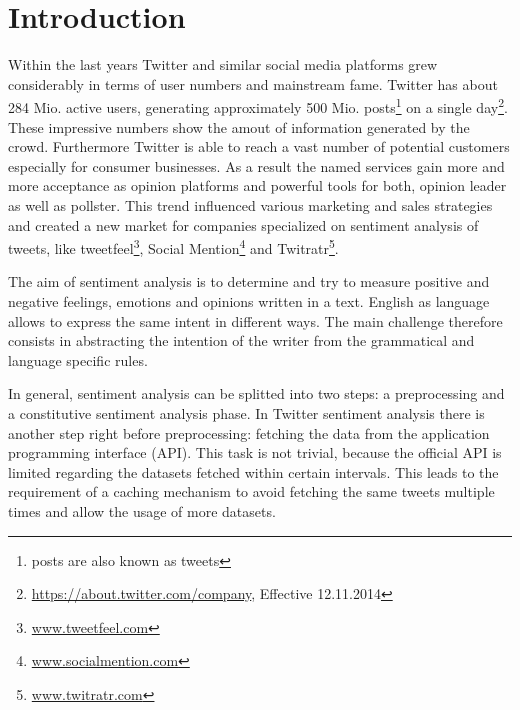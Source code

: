 \section{Introduction}


Within the last years Twitter and similar social media platforms grew considerably in terms of user numbers and mainstream fame. Twitter has about 284 Mio. active users, generating approximately 500 Mio. posts\footnote{posts are also known as tweets} on a single day\footnote{\url{https://about.twitter.com/company}, Effective 12.11.2014}. These impressive numbers show the amout of information generated by the crowd. Furthermore Twitter is able to reach a vast number of potential customers especially for consumer businesses. As a result the named services gain more and more acceptance as opinion platforms and powerful tools for both, opinion leader as well as pollster. This trend influenced various marketing and sales strategies and created a new market for companies specialized on sentiment analysis of tweets, like tweetfeel\footnote{\url{www.tweetfeel.com}}, Social Mention\footnote{\url{www.socialmention.com}} and Twitratr\footnote{\url{www.twitratr.com}}.


The aim of sentiment analysis is to determine and try to measure positive and negative feelings, emotions and opinions written in a text. English as language allows to express the same intent in different ways. The main challenge therefore consists in abstracting the intention of the writer from the grammatical and language specific rules. 

In general, sentiment analysis can be splitted into two steps: a preprocessing and a constitutive sentiment analysis phase. In Twitter sentiment analysis there is another step right before preprocessing: fetching the data from the application programming interface (API). This task is not trivial, because the official API is limited regarding the datasets fetched within certain intervals. This leads to the requirement of a caching mechanism to avoid fetching the same tweets multiple times and allow the usage of more datasets.



